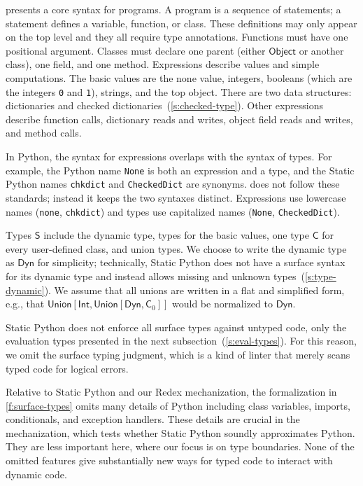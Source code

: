 \documentclass[english,cleveref,submission]{programming}
\newcommand{\SP}{Static Python}
\newcommand{\code}[1]{\texttt{#1}}
\newcommand{\typefont}[1]{\mathsf{#1}}
\newcommand{\paramtype}[2]{#1[#2]}
\newcommand{\sptype}{\typefont{S}}
\newcommand{\sptclass}{\typefont{C}}
\newcommand{\sptint}{\typefont{Int}}
\newcommand{\sptdyn}{\typefont{Dyn}}
\newcommand{\sptobject}{\typefont{Object}}
\newcommand{\sptunion}[1]{\paramtype{\typefont{Union}}{#1}}
\begin{document}
 presents a core syntax for programs.
A program is a sequence of statements;
a statement defines a variable, function, or class.
These definitions may only appear on the top level
and they all require type annotations.
Functions must have one positional argument.
Classes must declare one parent (either $\sptobject$ or another class), one field, and one method.
Expressions describe values and simple computations.
The basic values are the none value, integers,
booleans (which are the integers \code{0} and \code{1}), strings, and the top object.
There are two data structures: dictionaries and checked dictionaries~(\cref{s:checked-type}).
Other expressions describe function calls, dictionary reads and writes, object field reads and writes,
and method calls.

In Python, the syntax for expressions overlaps with the syntax of types.
For example, the Python name \code{None} is both an expression and a type,
and the \SP{} names \code{chkdict} and \code{CheckedDict} are synonyms.
 does not follow these standards; instead it keeps the two syntaxes distinct.
Expressions use lowercase names (\code{none}, \code{chkdict}) and types use capitalized
names (\code{None}, \code{CheckedDict}).

Types $\sptype$ include the dynamic type, types for the basic values, one type $\sptclass$ for every
user-defined class, and union types.
We choose to write the dynamic type as $\sptdyn$ for simplicity; technically,
\SP{} does not have a surface syntax for its dynamic
type and instead allows missing and unknown types~(\cref{s:type-dynamic}).
We assume that all unions are written in a flat and simplified form, e.g., that
$\sptunion{\sptint, \sptunion{\sptdyn, \sptclass_0}}$ would be normalized to $\sptdyn$.

\SP{} does not enforce all surface types against untyped code, only the evaluation
types presented in the next subsection~(\cref{s:eval-types}).
For this reason, we omit the surface typing judgment, which is a kind of linter
that merely scans typed code for logical errors.

Relative to \SP{} and our Redex mechanization, the formalization in \cref{f:surface-types} omits
many details of Python including class variables, imports, conditionals, and exception handlers.
These details are crucial in the mechanization, which tests whether \SP{}
soundly approximates Python.
They are less important here, where our focus is on type boundaries.
None of the omitted features give substantially new ways for typed code to interact with dynamic code.
\end{document}
